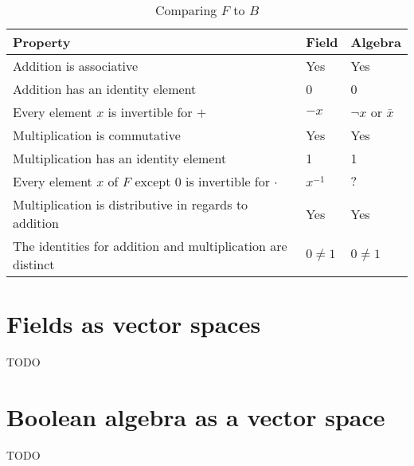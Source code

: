 \documentclass{article}
\begin{document}
\begin{table}[h]
	\centering
	\begin{tabular}{@{}lll@{}}
		\toprule
		Property                                                    & Field      & Algebra               \\ \toprule
		Addition is associative                                     & Yes        & Yes                   \\ \midrule
		Addition has an identity element                            & 0          & 0                     \\ \midrule
		Every element $x$ is invertible for $+$                     & $-x$       & $\neg x$ or $\bar{x}$ \\ \midrule
		Multiplication is commutative                               & Yes        & Yes                   \\ \midrule
		Multiplication has an identity element                      & 1          & 1                     \\ \midrule
		Every element $x$ of $F$ except 0 is invertible for $\cdot$ & $x^{-1}$   & $\text{?}$            \\ \midrule
		Multiplication is distributive in regards to addition       & Yes        & Yes                   \\ \midrule
		The identities for addition and multiplication are distinct & $0 \neq 1$ & $0 \neq 1$            \\ \bottomrule
	\end{tabular}
	\caption{Comparing $F$ to $B$}
\label{algebrafieldproof}
\end{table}

\section{Fields as vector spaces}
\label{sec:Fields as vector spaces}

TODO

\section{Boolean algebra as a vector space}
\label{sec:Boolean algebra as a vector space}

TODO

\newpage



\end{document}
